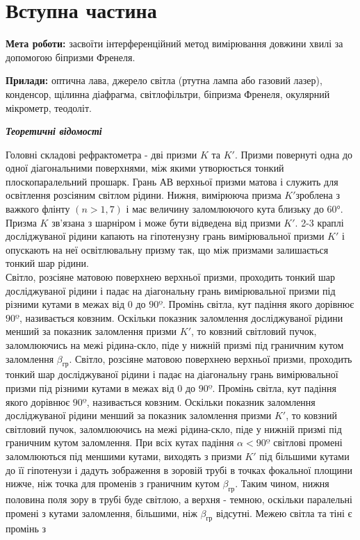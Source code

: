 \section{Вступна частина}
\setlength{\parindent}{4em}
\indent \textbf{Мета роботи:} засвоїти інтерференційний метод вимірювання довжини хвилі за допомогою
біпризми Френеля. \par
\textbf{Прилади:} оптична лава, джерело світла (ртутна лампа або газовий лазер), конденсор, щілинна діафрагма, світлофільтри, біпризма Френеля, окулярний мікрометр,
теодоліт.
\begin{center}
\textbf{\emph{Теоретичні відомості}}
\end{center}
\qquad Головні складові рефрактометра - дві призми $K$ та $K'$. Призми повернуті одна до одної діагональними поверхнями, між якими утворюється тонкий плоскопаралельний прошарк. Грань АВ верхньої призми матова і служить для освітлення розсіяним світлом рідини. Нижня, вимірююча призма $K'$зроблена з важкого флінту $(n>1,7)$ і має
величину заломлюючого кута близьку до $60°$. Призма $K$ зв’язана з шарніром і може бути відведена від призми $K'$. 2-3 краплі досліджуваної рідини капають на гіпотенузну грань вимірювальної призми $K'$ і опускають на неї освітлювальну призму так, що між призмами залишається тонкий шар рідини. \\
Світло, розсіяне матовою поверхнею верхньої призми, проходить тонкий шар досліджуваної рідини і падає на діагональну грань вимірювальної призми під різними кутами в межах від 0 до $90º$. Промінь світла, кут падіння якого дорівнює $90º$, називається ковзним. Оскільки показник заломлення досліджуваної рідини менший за показник заломлення призми $K'$, то ковзний світловий пучок, заломлюючись на межі рідина-скло, піде у нижній призмі під граничним кутом заломлення ${\beta}_{гр}$. Світло, розсіяне матовою поверхнею верхньої призми, проходить тонкий шар досліджуваної рідини і падає на діагональну грань вимірювальної призми під різними кутами в межах від 0 до $90º$. Промінь світла, кут падіння якого дорівнює $90º$, називається ковзним. Оскільки показник заломлення досліджуваної рідини менший за показник заломлення призми
$K'$, то ковзний світловий пучок, заломлюючись на межі рідина-скло, піде у нижній призмі під граничним кутом заломлення. При всіх кутах падіння $\alpha<90º$ світлові промені заломлюються під меншими кутами, виходять з призми $K'$ під більшими кутами до її гіпотенузи і дадуть зображення в зоровій трубі в точках фокальної площини нижче, ніж точка для променів з граничним кутом ${\beta}_{гр}$. Таким чином, нижня половина поля зору в трубі буде світлою, а верхня - темною, оскільки паралельні промені з кутами заломлення, більшими, ніж ${\beta}_{гр}$ відсутні. Межею світла та тіні є промінь з

